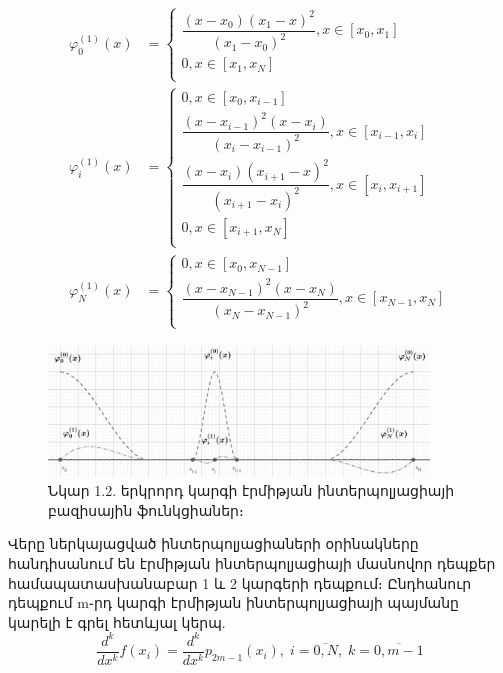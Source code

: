 \documentclass[fleqn, bachelor,subf,12pt,notitlepage]{article}
\begin{document}
\begin{equation}
\begin{aligned}
\varphi^{(1)}_{0}\left(x\right)&=\begin{cases}
\dfrac{\left(x-x_{0}\right)\left(x_{1}-x\right)^{2}}{\left(x_{1}-x_{0}\right)^{2}}, x\in \left[x_{0}, x_{1}\right]\\
0, x\in \left[x_{1}, x_{N}\right]\\
\end{cases}\\
\varphi^{(1)}_{i}\left(x\right)&=\begin{cases}
0, x\in \left[x_{0}, x_{i-1}\right]\\
\dfrac{\left(x-x_{i-1}\right)^2\left(x-x_{i}\right)}{\left(x_{i}-x_{i-1}\right)^{2}}, x\in \left[x_{i-1}, x_{i}\right]\\
\dfrac{\left(x-x_{i}\right)\left(x_{i+1}-x\right)^{2}}{\left(x_{i+1}-x_{i}\right)^{2}}, x\in \left[x_{i}, x_{i+1}\right]\\
0, x\in \left[x_{i+1}, x_{N}\right]\\
\end{cases}\\
\varphi^{(1)}_{N}\left(x\right)&=\begin{cases}
0, x\in \left[x_{0}, x_{N-1}\right]\\
\dfrac{\left(x-x_{N-1}\right)^{2}\left(x-x_{N}\right)}{\left(x_{N}-x_{N-1}\right)^{2}}, x\in \left[x_{N-1}, x_{N}\right]\\
\end{cases}
\end{aligned}
\end{equation}


\begin{figure}[h]
\centering
\includegraphics[width=0.9\textwidth]{images/one_var_quadratic}
\captionsetup{labelformat=empty}
\caption{\hfill Նկար 1.2. երկրորդ կարգի էրմիթյան ինտերպոլյացիայի բազիսային ֆունկցիաներ։}
\end{figure}
Վերը ներկայացված ինտերպոլյացիաների օրինակները հանդիսանում են էրմիթյան ինտերպոլյացիայի մասնովոր դեպքեր համապատասխանաբար 1 և 2 կարգերի դեպքում։
Ընդհանուր դեպքում m֊րդ կարգի էրմիթյան ինտերպոլյացիայի պայմանը կարելի է գրել հետևյալ կերպ.
\begin{equation}
\dfrac{d^{k}}{dx^{k}}f\left(x_{i}\right)=\dfrac{d^{k}}{dx^{k}}p_{2m-1}\left(x_{i}\right), \;  i=\overline{0, N}, \;  k=\overline{0, m-1}
\end{equation}
\newpage
\end{document}
